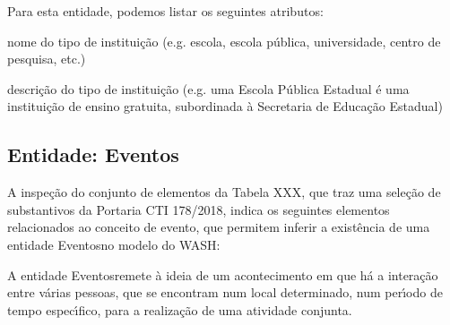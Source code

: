 \documentclass[
12pt,		%
openright,	%
twoside,  %
a4paper,			%
chapter=TITLE,		%
english,			%
french,				%
spanish,			%
brazil				%
]{USPSC-classe/USPSC}
\begin{document}
Para esta entidade, podemos listar os seguintes atributos:















\begin{alineas}
\item nome do tipo de institui\c{c}\~ao (e.g. escola, escola p\'ublica, universidade, centro de pesquisa, etc.)
\item descri\c{c}\~ao do tipo de institui\c{c}\~ao (e.g. \textquotedbl uma Escola P\'ublica Estadual \'e uma institui\c{c}\~ao de ensino gratuita, subordinada \`a Secretaria de Educa\c{c}\~ao Estadual\textquotedbl )
\end{alineas}

\subsection[Entidade: Eventos]{Entidade: Eventos}\label{Entidade: Eventos}
A inspe\c{c}\~ao do conjunto de elementos da Tabela XXX, que traz uma sele\c{c}\~ao de substantivos da Portaria CTI 178/2018, indica os seguintes elementos relacionados ao conceito de \textquotedbl evento\textquotedbl , que permitem inferir a exist\^encia de uma entidade \textquotedbl Eventos\textquotedbl  no modelo do WASH:















\noindent\begin{center}\mbox{\centering{}}\end{center}


A entidade \textquotedbl Eventos\textquotedbl  remete \`a ideia de um acontecimento em que h\'a a intera\c{c}\~ao entre v\'arias pessoas, que se encontram num local determinado, num per\'{\i}odo de tempo espec\'{\i}fico, para a realiza\c{c}\~ao de uma atividade conjunta.
\end{document}
